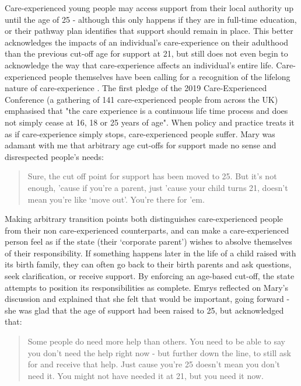 Care-experienced young people may access support from their local authority up until the age of 25 - although this only happens if they are in full-time education, or their pathway plan identifies that support should remain in place.  This better acknowledges the impacts of an individual’s care-experience on their adulthood than the previous cut-off age for support at 21, but still does not even begin to acknowledge the way that care-experience affects an individual's entire life.  Care-experienced people themselves have been calling for a recognition of the lifelong nature of care-experience \citep{the_care_experienced_conference_care_2019}. The first pledge of the 2019 Care-Experienced Conference (a gathering of 141 care-experienced people from across the UK) emphasised that "the care experience is a continuous life time process and does not simply cease at 16, 18 or 25 years of age". When policy and practice treats it as if care-experience simply stops, care-experienced people suffer. Mary was adamant with me that arbitrary age cut-offs for support made no sense and disrespected people's needs:
\begin{quote}
Sure, the cut off point for support has been moved to 25. But it's not enough, 'cause if you're a parent, just 'cause your child turns 21, doesn't mean you're like `move out'. You're there for 'em.
\end{quote}
Making arbitrary transition points both distinguishes care-experienced people from their non care-experienced counterparts, and can make a care-experienced person feel as if the state (their ‘corporate parent’) wishes to absolve themselves of their responsibility. If something happens later in the life of a child raised with its birth family, they can often go back to their birth parents and ask questions, seek clarification, or receive support. By enforcing an age-based cut-off, the state attempts to position its responsibilities as complete. Emrys reflected on Mary's discussion and explained that she felt that would be important, going forward - she was glad that the age of support had been raised to 25, but acknowledged that:
\begin{quote}
Some people do need more help than others. You need to be able to say you don't need the help right now - but further down the line, to still ask for and receive that help. Just cause you're 25 doesn't mean you don't need it. You might not have needed it at 21, but you need it now.
\end{quote}
